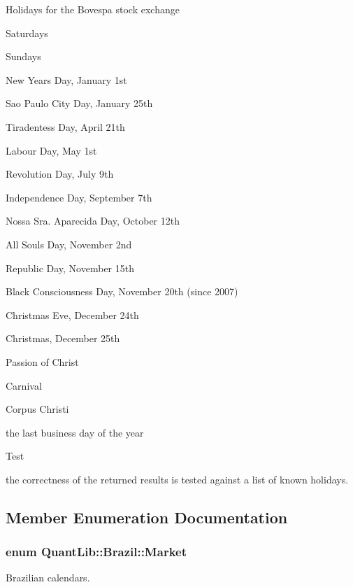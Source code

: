 Holidays for the Bovespa stock exchange 
\begin{DoxyItemize}
\item Saturdays 
\item Sundays 
\item New Year\textquotesingle{}s Day, January 1st 
\item Sao Paulo City Day, January 25th 
\item Tiradentes\textquotesingle{}s Day, April 21th 
\item Labour Day, May 1st 
\item Revolution Day, July 9th 
\item Independence Day, September 7th 
\item Nossa Sra. Aparecida Day, October 12th 
\item All Souls Day, November 2nd 
\item Republic Day, November 15th 
\item Black Consciousness Day, November 20th (since 2007) 
\item Christmas Eve, December 24th 
\item Christmas, December 25th 
\item Passion of Christ 
\item Carnival 
\item Corpus Christi 
\item the last business day of the year 
\end{DoxyItemize}

\begin{DoxyRefDesc}{Test}
\item[{\bf Test}]the correctness of the returned results is tested against a list of known holidays. \end{DoxyRefDesc}


\subsection{Member Enumeration Documentation}
\subsubsection[{Market}]{\setlength{\rightskip}{0pt plus 5cm}enum {\bf Quant\+Lib\+::\+Brazil\+::\+Market}}\label{class_quant_lib_1_1_brazil_ac5957409a44c31c4ef27eabbe63e4b16}


Brazilian calendars. 

